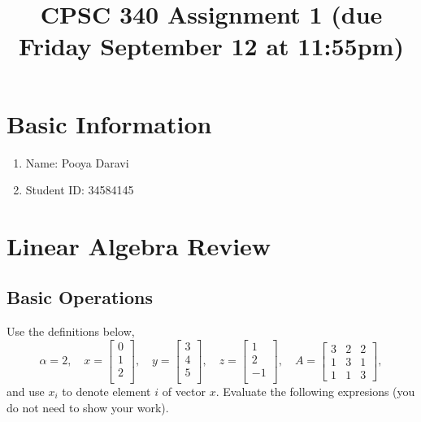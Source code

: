 \documentclass{article}
\def\blu#1{{\color{blu}#1}}
\def\enum#1{\begin{enumerate}#1\end{enumerate}}
\begin{document}
\lstset{language=julia}

\title{CPSC 340 Assignment 1 (due Friday September 12 at 11:55pm)}
\date{}
\maketitle
\vspace{-4em}


\section*{Basic Information}


\blu{\enum{
\item Name: Pooya Daravi
\item Student ID: 34584145
}
}


\section{Linear Algebra Review}
\subsection{Basic Operations}

Use the definitions below,
\[
\alpha = 2,\quad
x = \left[\begin{array}{c}
0\\
1\\
2\\
\end{array}\right], \quad 
y = \left[\begin{array}{c}
3\\
4\\
5\\
\end{array}\right],\quad
z = \left[\begin{array}{c}
1\\
2\\
-1\\
\end{array}\right],\quad
A = \left[\begin{array}{ccc}
3 & 2 & 2\\
1 & 3 & 1\\
1 & 1 & 3
\end{array}\right],
\]
and use $x_i$ to denote element $i$ of vector $x$.
\blu{Evaluate the following expresions} (you do not need to show your work).
\end{document}

